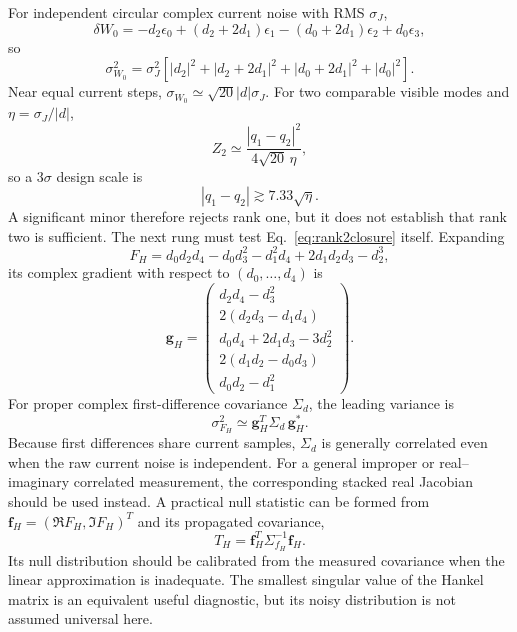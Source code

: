 \documentclass[11pt]{article}
\begin{document}
For independent circular complex current noise with RMS $\sigma_J$,
\begin{equation}
\delta W_0
=-d_2\epsilon_0+(d_2+2d_1)\epsilon_1
-(d_0+2d_1)\epsilon_2+d_0\epsilon_3,
\end{equation}
so
\begin{equation}
\boxed{
\sigma_{W_0}^2=\sigma_J^2\left[
|d_2|^2+|d_2+2d_1|^2+|d_0+2d_1|^2+|d_0|^2
\right].}
\label{eq:Wnoise}
\end{equation}
Near equal current steps, $\sigma_{W_0}\simeq\sqrt{20}|d|\sigma_J$. For two comparable visible modes and $\eta=\sigma_J/|d|$,
\begin{equation}
Z_2\simeq\frac{|q_1-q_2|^2}{4\sqrt{20}\,\eta},
\end{equation}
so a $3\sigma$ design scale is
\begin{equation}
\boxed{|q_1-q_2|\gtrsim7.33\sqrt{\eta}.}
\label{eq:twores}
\end{equation}
A significant minor therefore rejects rank one, but it does not establish that rank two is sufficient. The next rung must test Eq.~\eqref{eq:rank2closure} itself. Expanding
\begin{equation}
F_H=d_0d_2d_4-d_0d_3^2-d_1^2d_4+2d_1d_2d_3-d_2^3,
\end{equation}
its complex gradient with respect to $(d_0,\ldots,d_4)$ is
\begin{equation}
\mathbf g_H=
\begin{pmatrix}
d_2d_4-d_3^2\\
2(d_2d_3-d_1d_4)\\
d_0d_4+2d_1d_3-3d_2^2\\
2(d_1d_2-d_0d_3)\\
d_0d_2-d_1^2
\end{pmatrix}.
\label{eq:hankel_det_gradient}
\end{equation}
For proper complex first-difference covariance $\Sigma_d$, the leading variance is
\begin{equation}
\boxed{\sigma_{F_H}^2\simeq \mathbf g_H^{T}\Sigma_d\,\mathbf g_H^*.}
\label{eq:hankel_det_variance}
\end{equation}
Because first differences share current samples, $\Sigma_d$ is generally correlated even when the raw current noise is independent. For a general improper or real--imaginary correlated measurement, the corresponding stacked real Jacobian should be used instead. A practical null statistic can be formed from $\mathbf f_H=(\Re F_H,\Im F_H)^T$ and its propagated covariance,
\begin{equation}
\boxed{T_H=\mathbf f_H^T\Sigma_{f_H}^{-1}\mathbf f_H.}
\label{eq:hankel_det_stat}
\end{equation}
Its null distribution should be calibrated from the measured covariance when the linear approximation is inadequate. The smallest singular value of the Hankel matrix is an equivalent useful diagnostic, but its noisy distribution is not assumed universal here.
\end{document}
